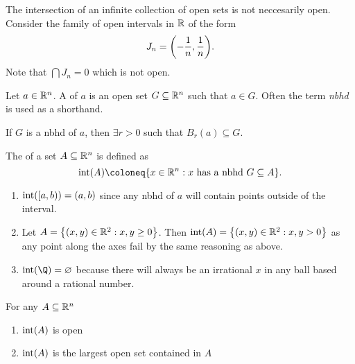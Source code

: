 \documentclass[../main.tex]{subfiles}
\begin{document}
\begin{remark}
    The intersection of an infinite collection of open sets is not neccesarily open. Consider the family of open intervals in $\mathbb{R}$ of the form
    \[
        J_n = \qty(-\frac{1}{n}, \frac{1}{n})
    .\]
    Note that $\bigcap J_n = \qty{0}$ which is not open.
\end{remark}

\begin{definition}[Neighborhood]
    Let $a \in \mathbb{R}^n$. A  of $a$ is an open set $G\subseteq \mathbb{R}^n$ such that $a \in G$. Often the term \emph{nbhd} is used as a shorthand.
\end{definition}

\begin{remark}
    If $G$ is a nbhd of $a$, then $\exists r > 0$ such that $B_r(a) \subseteq G$.
\end{remark}

\begin{definition}[Interior]
    The  of a set $A \subseteq \mathbb{R}^n$ is defined as
    \[
        \interior(A) \coloneq \qty{x \in \R^n : x\text{ has a nbhd } G \subseteq A}
    .\]
\end{definition}

\begin{example}
    \hfill
    \begin{enumerate}[label=\roman*)]
        \item $\operatorname{int}([a,b)) = (a,b)$ since any nbhd of $a$ will contain points outside of the interval.
        \item Let $A = \qty{(x,y) \in \mathbb{R}^2 : x,y \geq 0}$. Then $\operatorname{int}(A) = \qty{(x,y) \in \mathbb{R}^2 : x,y > 0}$ as any point along the axes fail by the same reasoning as above.
        \item $\interior(\Q) = \varnothing$ because there will always be an irrational $x$ in any ball based around a rational number.
    \end{enumerate}
\end{example}

\begin{theorem}
    For any $A \subseteq \mathbb{R}^n$
    \begin{enumerate}[label=\roman*)]
        \item $\operatorname{int}(A)$ is open
        \item $\operatorname{int}(A)$ is the largest open set contained in $A$
    \end{enumerate}
\end{theorem}
\end{document}
